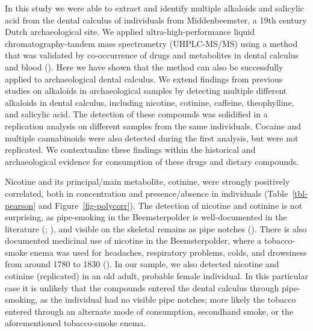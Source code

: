 \documentclass[
  11pt,
  leqno]{scrartcl}
\begin{document}
In this study we were able to extract and identify multiple alkaloids
and salicylic acid from the dental calculus of individuals from
Middenbeemster, a 19th century Dutch archaeological site. We applied
ultra-high-performance liquid chromatography-tandem mass spectrometry
(UHPLC-MS/MS) using a method that was validated by co-occurrence of
drugs and metabolites in dental calculus and blood
(). Here
we have shown that the method can also be successfully applied to
archaeological dental calculus. We extend findings from previous studies
on alkaloids in archaeological samples by detecting multiple different
alkaloids in dental calculus, including nicotine, cotinine, caffeine,
theophylline, and salicylic acid. The detection of these compounds was
solidified in a replication analysis on different samples from the same
individuals. Cocaine and multiple cannabinoids were also detected during
the first analysis, but were not replicated. We contextualize these
findings within the historical and archaeological evidence for
consumption of these drugs and dietary compounds.

Nicotine and its principal/main metabolite, cotinine, were strongly
positively correlated, both in concentration and presence/absence in
individuals (Table~\ref{tbl-pearson} and Figure~\ref{fig-polycorr}). The
detection of nicotine and cotinine is not surprising, as pipe-smoking in
the Beemsterpolder is well-documented in the literature
(;
), and visible on the
skeletal remains as pipe notches
(). There
is also documented medicinal use of nicotine in the Beemsterpolder,
where a tobacco-smoke enema was used for headaches, respiratory
problems, colds, and drowsiness from around 1780 to 1830
(). In our sample, we
also detected nicotine and cotinine (replicated) in an old adult,
probable female individual. In this particular case it is unlikely that
the compounds entered the dental calculus through pipe-smoking, as the
individual had no visible pipe notches; more likely the tobacco entered
through an alternate mode of consumption, secondhand smoke, or the
aforementioned tobacco-smoke enema.
\end{document}
